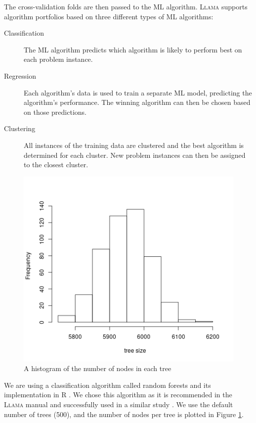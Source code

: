\documentclass{l4proj}
\theoremstyle{definition}
\theoremstyle{remark}
\begin{document}
The cross-validation folds are then passed to the ML algorithm. \textsc{Llama}
\cite{kotthoff_llama_2013, llama} supports algorithm portfolios based on three
different types of ML algorithms:

\begin{description}
  \item[Classification] The ML algorithm predicts which algorithm is likely to
    perform best on each problem instance.
  \item[Regression] Each algorithm's data is used to train a separate ML model,
    predicting the algorithm's performance. The winning algorithm can then be
    chosen based on those predictions.
  \item[Clustering] All instances of the training data are clustered and the
    best algorithm is determined for each cluster. New problem instances can
    then be assigned to the closest cluster.
\end{description}

\begin{figure}
  \centering
  \includegraphics[scale=0.7]{images/tree_sizes.png}
  \caption{A histogram of the number of nodes in each tree}
  \label{fig:tree_size}
\end{figure}

We are using a classification algorithm called random forests
\cite{DBLP:journals/ml/Breiman01} and its implementation in R
\cite{randomforest}. We chose this algorithm as it is recommended in the
\textsc{Llama} manual \cite{kotthoff_llama_2013} and successfully used in a
similar study \cite{DBLP:conf/lion/KotthoffMS16}. We use the default number of
trees (500), and the number of nodes per tree is plotted in Figure
\ref{fig:tree_size}.
\end{document}
